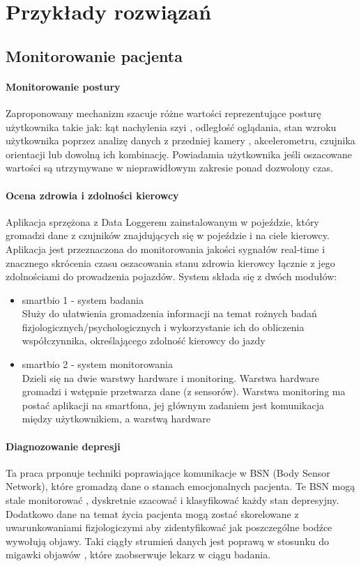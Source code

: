 \documentclass[11pt,twoside,a4paper]
{article}
\begin{document}
\section{Przykłady rozwiązań}
\subsection{Monitorowanie pacjenta}
\paragraph{Monitorowanie postury \cite{Lee:2012:MPM:2370216.2370320}\\}
Zaproponowany mechanizm szacuje różne wartości reprezentujące posturę użytkownika takie jak: kąt nachylenia szyi , odległość oglądania, stan wzroku użytkownika poprzez analizę danych z przedniej kamery , akcelerometru, czujnika orientacji lub dowolną ich kombinację. Powiadamia użytkownika jeśli oszacowane
wartości są utrzymywane w nieprawidłowym zakresie ponad dozwolony czas.
\paragraph{Ocena zdrowia i zdolności kierowcy \cite{6583819}\\}
Aplikacja sprzężona z Data Loggerem zainstalowanym w pojeździe, który gromadzi dane z czujników znajdujących się w pojeździe i na ciele kierowcy. Aplikacja jest przeznaczona do monitorowania jakości sygnałów real-time i znacznego skrócenia czasu oszacowania stanu zdrowia kierowcy łącznie z jego zdolnościami do prowadzenia pojazdów. System składa się z dwóch modułów:
\begin{itemize}
\item smartbio 1 - system badania\\
Służy do ułatwienia gromadzenia informacji na temat rożnych badań fizjologicznych/psychologicznych i wykorzystanie ich do obliczenia współczynnika, określającego zdolność kierowcy do jazdy

\item smartbio 2 - system monitorowania\\
Dzieli się na dwie warstwy hardware i monitoring. Warstwa hardware gromadzi i wstępnie przetwarza dane (z sensorów). Warstwa monitoring ma postać aplikacji na smartfona, jej głównym zadaniem jest komunikacja między użytkownikiem, a warstwą hardware
\end{itemize}
\paragraph{Diagnozowanie depresji\\}
 Ta praca prponuje techniki poprawiające komunikacje w BSN (Body Sensor Network), które gromadzą dane o stanach emocjonalnych pacjenta. 
 Te BSN  mogą stale monitorować , dyskretnie szacować i klasyfikować każdy stan depresyjny. Dodatkowo dane na temat życia pacjenta mogą zostać skorelowane z 
 uwarunkowaniami fizjologiczymi aby zidentyfikować jak poszczególne bodźce wywołują objawy. Taki ciągły strumień danych jest poprawą w stosunku do 
 migawki objawów , które zaobserwuje lekarz w ciągu badania. 
 
\end{document}
